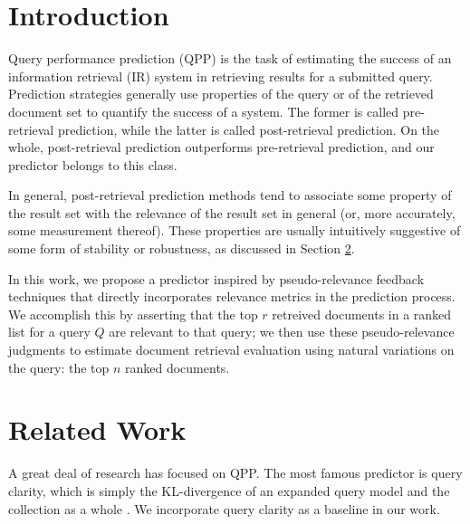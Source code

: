 \documentclass{sig-alternate}
\begin{document}
\author{Garrick Sherman}

\title{}

\maketitle
\begin{abstract}
\end{abstract}

\section{Introduction}\label{section.intro}

Query performance prediction (QPP) is the task of estimating the success of an information retrieval (IR) system in retrieving results for a submitted query. Prediction strategies generally use properties of the query or of the retrieved document set to quantify the success of a system. The former is called pre-retrieval prediction, while the latter is called post-retrieval prediction. On the whole, post-retrieval prediction outperforms pre-retrieval prediction, and our predictor belongs to this class.

In general, post-retrieval prediction methods tend to associate some property of the result set with the relevance of the result set in general (or, more accurately, some measurement thereof). These properties are usually intuitively suggestive of some form of stability or robustness, as discussed in Section \ref{section.related}. 

In this work, we propose a predictor inspired by pseudo-relevance feedback techniques that directly incorporates relevance metrics in the prediction process. We accomplish this by asserting that the top $r$ retreived documents in a ranked list for a query $Q$ are relevant to that query; we then use these pseudo-relevance judgments to estimate document retrieval evaluation using natural variations on the query: the top $n$ ranked documents. 

\section{Related Work}\label{section.related}

A great deal of research has focused on QPP. The most famous predictor is query clarity, which is simply the KL-divergence of an expanded query model and the collection as a whole \cite{Cronen-Townsend2002}. We incorporate query clarity as a baseline in our work.
\end{document}

